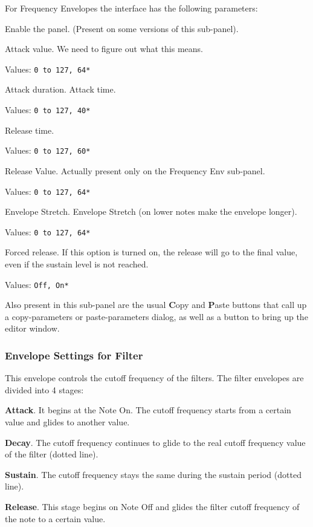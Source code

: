    For Frequency Envelopes the interface has the following parameters:

   \setcounter{ItemCounter}{0}      %

   Enable the panel.  (Present on some versions of this sub-panel).

   Attack value.
   We need to figure out what this means.

   Values: \texttt{0 to 127, 64*}

   Attack duration. Attack time.

   Values: \texttt{0 to 127, 40*}

   Release time.

   Values: \texttt{0 to 127, 60*}

   Release Value.
   Actually present only on the Frequency Env sub-panel.

   Values: \texttt{0 to 127, 64*}

   Envelope Stretch.
   Envelope Stretch (on lower notes make the envelope longer).

   Values: \texttt{0 to 127, 64*}

   Forced release.
   If this option is turned on, the release will go to the
   final value, even if the sustain level is not reached.

   Values: \texttt{Off, On*}

   Also present in this sub-panel are the usual \textbf{C}opy
   and \textbf{P}aste buttons that call up a copy-parameters or
   paste-parameters dialog, as well as a button
   to bring up the editor window.

\subsubsection{Envelope Settings for Filter}
\label{subsubsec:envelope_settings_for_filter}

   This envelope controls the cutoff frequency of the filters.
   The filter envelopes are divided into 4 stages:

   \begin{enumber}
      \item \textbf{Attack}.
         It begins at the Note On.
         The cutoff frequency starts from a certain value and glides to another
         value.
      \item \textbf{Decay}.
         The cutoff frequency continues to glide to the real cutoff frequency
         value of the filter (dotted line).
      \item \textbf{Sustain}.
         The cutoff frequency stays the same during the sustain period (dotted
         line).
      \item \textbf{Release}.
         This stage begins on Note Off and glides the filter cutoff frequency
         of the note to a certain value.
   \end{enumber}

